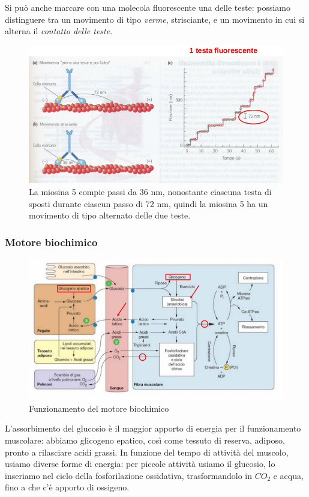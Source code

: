 \documentclass[a4paper,12pt]{article}
\begin{document}
Si può anche marcare con una molecola fluorescente una delle teste: possiamo distinguere tra un movimento di tipo \emph{verme}, strisciante, e un movimento in cui si alterna il \emph{contatto delle teste}.
\begin{figure}[H]
\centering
\includegraphics[scale=0.4]{immagine/marcatura.jpg}
\caption{La miosina 5 compie passi da 36 nm, nonostante ciascuna testa di sposti durante ciascun passo di 72 nm, quindi la miosina 5 ha un movimento di tipo alternato delle due teste.}
\end{figure}
\subsubsection{Motore biochimico}
\begin{figure}[H]
\centering
\includegraphics[scale=0.4]{immagine/motore_biochimico.jpg}
\caption{Funzionamento del motore biochimico}
\end{figure}

L'assorbimento del glucosio è il maggior apporto di energia per il funzionamento muscolare: abbiamo glicogeno epatico, così come tessuto di reserva, adiposo, pronto a rilasciare acidi grassi. In funzione del tempo di attività del muscolo, usiamo diverse forme di energia: per piccole attività usiamo il glucosio, lo inseriamo nel ciclo della fosforilazione ossidativa, trasformandolo in $CO_{2}$ e acqua, fino a che c'è apporto di ossigeno. 
\end{document}

